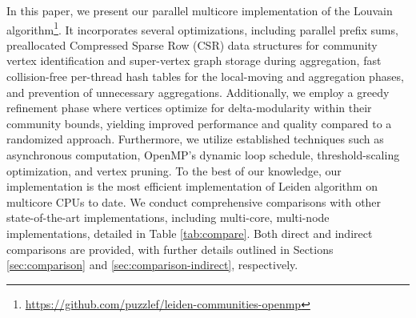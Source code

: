 In this paper, we present our parallel multicore implementation of the Louvain algorithm\footnote{\url{https://github.com/puzzlef/leiden-communities-openmp}}. It incorporates several optimizations, including parallel prefix sums, preallocated Compressed Sparse Row (CSR) data structures for community vertex identification and super-vertex graph storage during aggregation, fast collision-free per-thread hash tables for the local-moving and aggregation phases, and prevention of unnecessary aggregations. Additionally, we employ a greedy refinement phase where vertices optimize for delta-modularity within their community bounds, yielding improved performance and quality compared to a randomized approach. Furthermore, we utilize established techniques such as asynchronous computation, OpenMP's dynamic loop schedule, threshold-scaling optimization, and vertex pruning. To the best of our knowledge, our implementation is the most efficient implementation of Leiden algorithm on multicore CPUs to date. We conduct comprehensive comparisons with other state-of-the-art implementations, including multi-core, multi-node implementations, detailed in Table \ref{tab:compare}. Both direct and indirect comparisons are provided, with further details outlined in Sections \ref{sec:comparison} and \ref{sec:comparison-indirect}, respectively.











